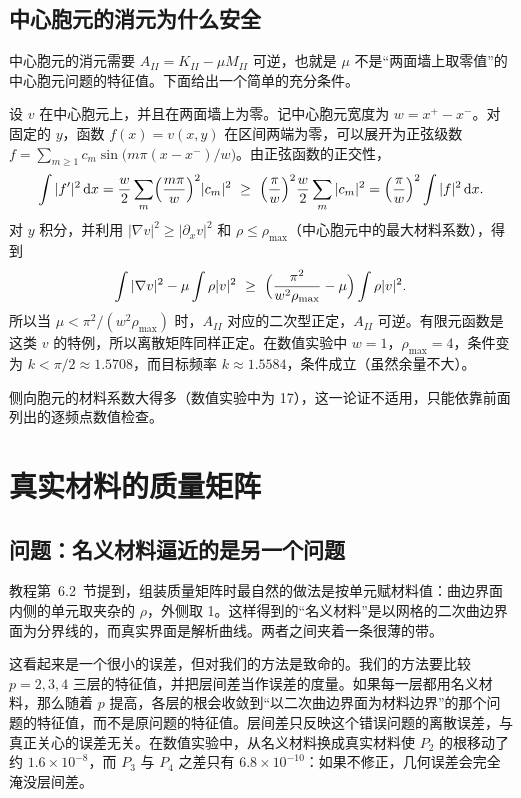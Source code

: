 \documentclass[11pt,a4paper,fontset=fandol]{ctexart}
\begin{document}
\subsection{中心胞元的消元为什么安全}
\label{sec:center-safe}

中心胞元的消元需要 $A_{II}=K_{II}-\mu M_{II}$ 可逆，也就是 $\mu$ 不是“两面墙上取零值”的中心胞元问题的特征值。下面给出一个简单的充分条件。

设 $v$ 在中心胞元上，并且在两面墙上为零。记中心胞元宽度为 $w=x^+-x^-$。对固定的 $y$，函数 $f(x)=v(x,y)$ 在区间两端为零，可以展开为正弦级数 $f=\sum_{m\ge1}c_m\sin\bigl(m\pi(x-x^-)/w\bigr)$。由正弦函数的正交性，
\[
\int|f'|^2\,\mathrm{d} x=\frac w2\sum_m\Bigl(\frac{m\pi}w\Bigr)^2|c_m|^2\ \ge\ \Bigl(\frac\pi w\Bigr)^2\frac w2\sum_m|c_m|^2=\Bigl(\frac\pi w\Bigr)^2\int|f|^2\,\mathrm{d} x .
\]
对 $y$ 积分，并利用 $|\nabla v|^2\ge|\partial_xv|^2$ 和 $\rho\le\rho_{\max}$（中心胞元中的最大材料系数），得到
\[
\int|\nabla v|^2-\mu\int\rho|v|^2\ \ge\ \Bigl(\frac{\pi^2}{w^2\rho_{\max}}-\mu\Bigr)\int\rho|v|^2 .
\]
所以当 $\mu<\pi^2/(w^2\rho_{\max})$ 时，$A_{II}$ 对应的二次型正定，$A_{II}$ 可逆。有限元函数是这类 $v$ 的特例，所以离散矩阵同样正定。在数值实验中 $w=1$，$\rho_{\max}=4$，条件变为 $k<\pi/2\approx1.5708$，而目标频率 $k\approx1.5584$，条件成立（虽然余量不大）。

侧向胞元的材料系数大得多（数值实验中为 17），这一论证不适用，只能依靠前面列出的逐频点数值检查。

\section{真实材料的质量矩阵}
\label{sec:mass}

\subsection{问题：名义材料逼近的是另一个问题}

教程第~6.2~节提到，组装质量矩阵时最自然的做法是按单元赋材料值：曲边界面内侧的单元取夹杂的 $\rho$，外侧取 1。这样得到的“名义材料”是以网格的二次曲边界面为分界线的，而真实界面是解析曲线。两者之间夹着一条很薄的带。

这看起来是一个很小的误差，但对我们的方法是致命的。我们的方法要比较 $p=2,3,4$ 三层的特征值，并把层间差当作误差的度量。如果每一层都用名义材料，那么随着 $p$ 提高，各层的根会收敛到“以二次曲边界面为材料边界”的那个问题的特征值，而不是原问题的特征值。层间差只反映这个错误问题的离散误差，与真正关心的误差无关。在数值实验中，从名义材料换成真实材料使 $P_2$ 的根移动了约 $1.6\times10^{-8}$，而 $P_3$ 与 $P_4$ 之差只有 $6.8\times10^{-10}$：如果不修正，几何误差会完全淹没层间差。
\end{document}
